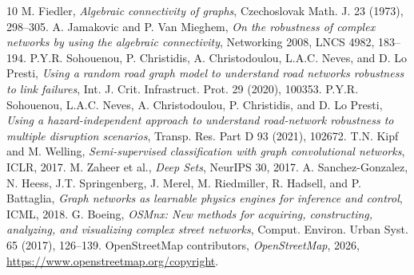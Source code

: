 \documentclass[11pt]{amsart}
\begin{document}
\begin{thebibliography}{10}
 M. Fiedler, \emph{Algebraic connectivity of graphs},
Czechoslovak Math. J. 23 (1973), 298--305.
 A. Jamakovic and P. Van Mieghem, \emph{On the
robustness of complex networks by using the algebraic connectivity}, Networking
2008, LNCS 4982, 183--194.
 P.Y.R. Sohouenou, P. Christidis, A. Christodoulou,
L.A.C. Neves, and D. Lo Presti, \emph{Using a random road graph model to
understand road networks robustness to link failures}, Int. J. Crit. Infrastruct.
Prot. 29 (2020), 100353.
 P.Y.R. Sohouenou, L.A.C. Neves, A. Christodoulou,
P. Christidis, and D. Lo Presti, \emph{Using a hazard-independent approach to
understand road-network robustness to multiple disruption scenarios}, Transp.
Res. Part D 93 (2021), 102672.
 T.N. Kipf and M. Welling, \emph{Semi-supervised
classification with graph convolutional networks}, ICLR, 2017.
 M. Zaheer et al., \emph{Deep Sets}, NeurIPS 30, 2017.
 A. Sanchez-Gonzalez, N. Heess, J.T. Springenberg,
J. Merel, M. Riedmiller, R. Hadsell, and P. Battaglia, \emph{Graph networks as
learnable physics engines for inference and control}, ICML, 2018.
 G. Boeing, \emph{OSMnx: New methods for acquiring,
constructing, analyzing, and visualizing complex street networks}, Comput.
Environ. Urban Syst. 65 (2017), 126--139.
 OpenStreetMap contributors, \emph{OpenStreetMap}, 2026,
\url{https://www.openstreetmap.org/copyright}.
\end{thebibliography}
\end{document}
